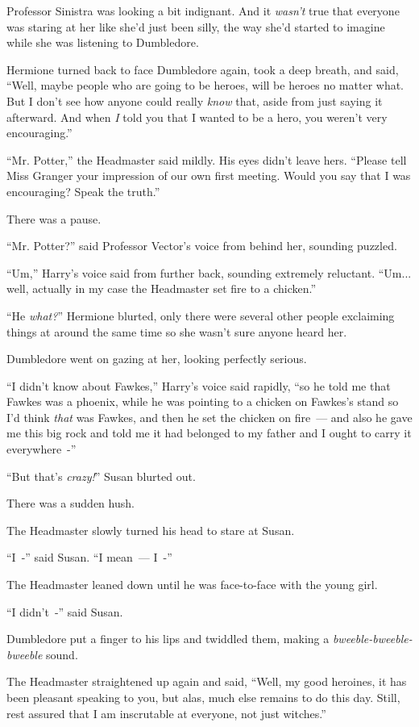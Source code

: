 Professor Sinistra was looking a bit indignant. And it \emph{wasn't} true that everyone was staring at her like she'd just been silly, the way she'd started to imagine while she was listening to Dumbledore.

Hermione turned back to face Dumbledore again, took a deep breath, and said, ``Well, maybe people who are going to be heroes, will be heroes no matter what. But I don't see how anyone could really \emph{know} that, aside from just saying it afterward. And when \emph{I} told you that I wanted to be a hero, you weren't very encouraging.''

``Mr. Potter,'' the Headmaster said mildly. His eyes didn't leave hers. ``Please tell Miss Granger your impression of our own first meeting. Would you say that I was encouraging? Speak the truth.''

There was a pause.

``Mr. Potter?'' said Professor Vector's voice from behind her, sounding puzzled.

``Um,'' Harry's voice said from further back, sounding extremely reluctant. ``Um... well, actually in my case the Headmaster set fire to a chicken.''

``He \emph{what?}'' Hermione blurted, only there were several other people exclaiming things at around the same time so she wasn't sure anyone heard her.

Dumbledore went on gazing at her, looking perfectly serious.

``I didn't know about Fawkes,'' Harry's voice said rapidly, ``so he told me that Fawkes was a phoenix, while he was pointing to a chicken on Fawkes's stand so I'd think \emph{that} was Fawkes, and then he set the chicken on fire~--- and also he gave me this big rock and told me it had belonged to my father and I ought to carry it everywhere~-''

``But that's \emph{crazy!}'' Susan blurted out.

There was a sudden hush.

The Headmaster slowly turned his head to stare at Susan.

``I~-'' said Susan. ``I mean~--- I~-''

The Headmaster leaned down until he was face-to-face with the young girl.

``I didn't~-'' said Susan.

Dumbledore put a finger to his lips and twiddled them, making a \emph{bweeble-bweeble-bweeble} sound.

The Headmaster straightened up again and said, ``Well, my good heroines, it has been pleasant speaking to you, but alas, much else remains to do this day. Still, rest assured that I am inscrutable at everyone, not just witches.''

